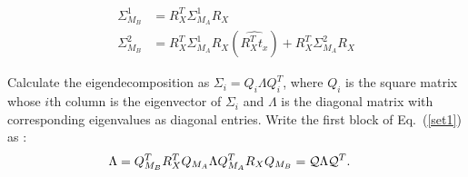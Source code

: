 \documentclass[twocolumn,10pt]{asme2ej}
\begin{document}
\begin{subequations} 
\begin{align}
\Sigma_{M_B}^1 &=  R^T_X \Sigma_{M_A}^1 R_X \label{set11} \\
\Sigma_{M_B}^2 &=  R^T_X \Sigma_{M_A}^1 R_X(\widehat{R^T_X t_x}) + R^T_X \Sigma_{M_A}^2 R_X  \label{set12}
\end{align}
\end{subequations}

Calculate the eigendecomposition as $ \Sigma_{i}=Q_i \Lambda Q_i^T$, where $Q_i$ is the square matrix whose $i$th column is the eigenvector of $\Sigma_i$ and $\Lambda$ is the diagonal matrix with corresponding eigenvalues as diagonal entries. Write the first block of Eq.~(\ref{set1}) as \cite{ackermanGSI, ackermanIROS2013}:
\begin{align}
\Lambda &= Q_{M_B}^T R_X^T Q_{M_A} \Lambda Q_{M_A}^T R_X Q_{M_B} = {\cal Q} \Lambda {\cal Q}^T.
\label{QAQ}
\end{align}

\end{document}

